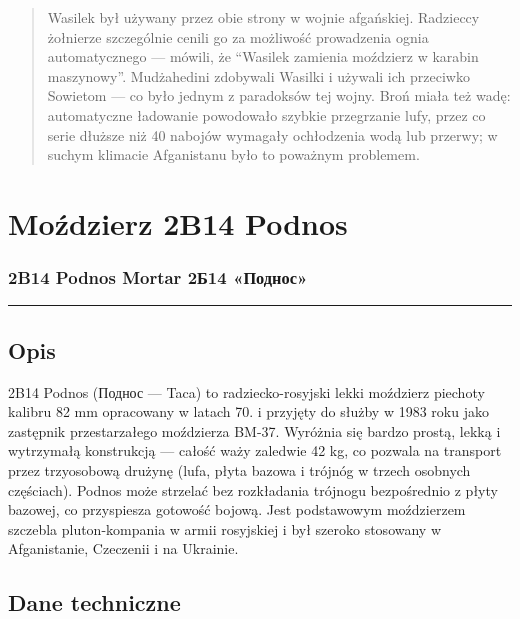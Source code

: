 \documentclass[12pt,openany,oneside]{book}
\begin{document}
\begin{quote}
Wasilek był używany przez obie strony w wojnie afgańskiej. Radzieccy
żołnierze szczególnie cenili go za możliwość prowadzenia ognia
automatycznego --- mówili, że ``Wasilek zamienia moździerz w karabin
maszynowy''. Mudżahedini zdobywali Wasilki i używali ich przeciwko
Sowietom --- co było jednym z paradoksów tej wojny. Broń miała też wadę:
automatyczne ładowanie powodowało szybkie przegrzanie lufy, przez co
serie dłuższe niż 40 nabojów wymagały ochłodzenia wodą lub przerwy; w
suchym klimacie Afganistanu było to poważnym problemem.
\end{quote}

\chapter{Moździerz 2B14 Podnos}\label{moux17adzierz-2b14-podnos}

\subsection{2B14 Podnos Mortar \textbar{} 2Б14
«Поднос»}\label{b14-podnos-mortar-2ux43114-ux43fux43eux434ux43dux43eux441}

\begin{center}\rule{0.5\linewidth}{0.5pt}\end{center}

\section{Opis}\label{opis-25}

2B14 Podnos (Поднос --- Taca) to radziecko-rosyjski lekki moździerz
piechoty kalibru 82 mm opracowany w latach 70. i przyjęty do służby w
1983 roku jako zastępnik przestarzałego moździerza BM-37. Wyróżnia się
bardzo prostą, lekką i wytrzymałą konstrukcją --- całość waży zaledwie
42 kg, co pozwala na transport przez trzyosobową drużynę (lufa, płyta
bazowa i trójnóg w trzech osobnych częściach). Podnos może strzelać bez
rozkładania trójnogu bezpośrednio z płyty bazowej, co przyspiesza
gotowość bojową. Jest podstawowym moździerzem szczebla pluton-kompania w
armii rosyjskiej i był szeroko stosowany w Afganistanie, Czeczenii i na
Ukrainie.

\section{Dane techniczne}\label{dane-techniczne-25}
\end{document}
